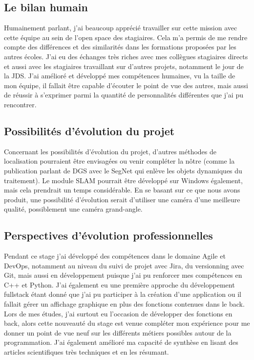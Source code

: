 \documentclass[11pt]{article}
\begin{document}
    \subsection{Le bilan humain}
      Humainement parlant, j'ai beaucoup apprécié travailler sur cette mission avec cette équipe au sein de l'open space des
      stagiaires. Cela m'a permis de me rendre compte des différences et des similarités dans les formations proposées par les 
      autres écoles. J'ai eu des échanges très riches avec mes collègues stagiaires directs et aussi avec les stagiaires travaillant 
      sur d'autres projets, notamment le jour de la JDS.    
      J'ai amélioré et développé mes compétences humaines, vu la taille de mon équipe, il fallait être capable 
      d'écouter le point de vue des autres, mais aussi de réussir à s'exprimer parmi la quantité de personnalités 
      différentes que j'ai pu rencontrer.

    \subsection{Possibilités d'évolution du projet}
      Concernant les possibilités d'évolution du projet, d'autres méthodes de localisation pourraient être envisagées ou venir
      compléter la nôtre (comme la publication parlant de DGS avec le SegNet qui enlève les objets dynamiques du traitement).
      Le module SLAM pourrait être développé sur Windows également, mais cela prendrait un temps considérable. 
      En se basant sur ce que nous avons produit, une possibilité d'évolution serait d'utiliser une caméra d'une meilleure qualité, 
      possiblement une caméra grand-angle.  

    \subsection{Perspectives d'évolution professionnelles}

      Pendant ce stage j'ai développé des compétences dans le domaine Agile et DevOps, notamment au niveau du 
      suivi de projet avec Jira, du versionning avec Git, mais aussi en développement puisque j'ai pu renforcer 
      mes compétences en C++ et Python. J'ai également eu une première approche du développement fullstack 
      étant donné que j'ai pu participer à la création d'une application ou il fallait gérer un affichage 
      graphique en plus des fonctions contenues dans le back. Lors de mes études, j'ai surtout eu l'occasion de 
      développer des fonctions en back, alors cette nouveauté du stage est venue compléter mon expérience pour me 
      donner un point de vue neuf sur les différents métiers possibles autour de la programmation.
      J'ai également amélioré ma capacité de synthèse en lisant des articles scientifiques très techniques et en 
      les résumant.
\end{document}
